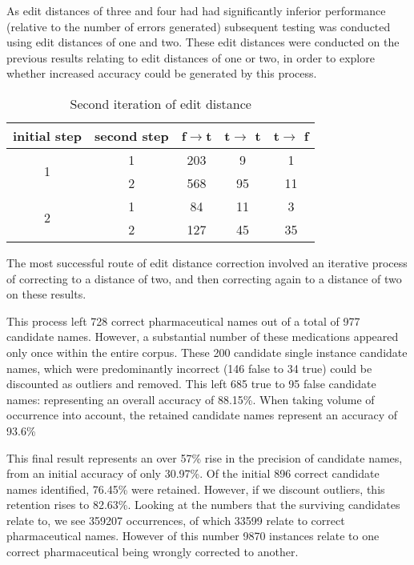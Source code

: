 As edit distances of three and four had had significantly inferior performance (relative to the number of errors generated) subsequent testing was conducted using edit distances of one and two. These edit distances were conducted on the previous results relating to edit distances of one or two, in order to explore whether increased accuracy could be generated by this process.



\begin{table}
\renewcommand{\arraystretch}{1.3}
\caption{Second iteration of edit distance}
\label{table2}
\centering
\begin{tabular}{|c||c||c||c||c|}
\hline
initial step & second step & f$\rightarrow$t & t$\rightarrow$ t & t$\rightarrow$ f\\
\hline
\multirow{2}{*}{1} & 1 & 203 & 9  & 1   \\
\hhline{~----}
 & 2 & 568 & 95 & 11    \\
\hline
\multirow{2}{*}{2} & 1 & 84 & 11 & 3   \\
\hhline{~----}
 & 2 & 127 & 45 & 35  \\
\hline

\end{tabular}
\end{table}



The most successful route of edit distance correction involved an iterative process of correcting to a distance of two, and then correcting again to a distance of two on these results. 

This process left 728 correct pharmaceutical names out of a total of 977 candidate names. However, a substantial number of these medications appeared only once within the entire corpus. These 200 candidate single instance candidate names, which were predominantly incorrect (146 false to 34 true) could be discounted as outliers and removed. This left 685 true to 95 false candidate names: representing an overall accuracy of 88.15\%. When taking volume of occurrence into account, the retained candidate names represent an accuracy of 93.6\%

This final result represents an over 57\% rise in the precision of candidate names, from an initial accuracy of only 30.97\%. Of the initial 896 correct candidate names identified, 76.45\% were retained. However, if we discount outliers, this retention rises to 82.63\%. Looking at the numbers that the surviving candidates relate to, we see 359207 occurrences, of which 33599 relate to correct pharmaceutical names. However of this number  9870 instances relate to one correct pharmaceutical being wrongly corrected to another.

